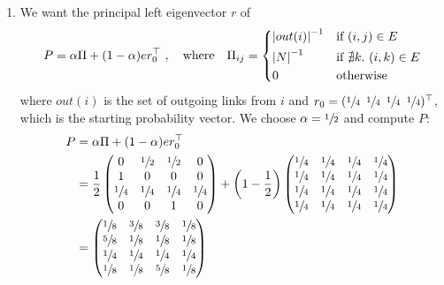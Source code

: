\begin{enumerate}
  \item We want the principal left eigenvector $r$ of
  \begin{align*}
    P = \alpha\Pi + (1 - \alpha) er_0^\top\ ,
    \quad\text{where}\quad
    \Pi_{ij} =
    \begin{cases*}
      \left|out(i)\right|^{-1} & if $(i, j)
      \in E$\\
      \left| N \right|^{-1} & if $\nexists k.\ (i, k) \in E$\\
      0 & otherwise
    \end{cases*}
  \end{align*}
  where $out(i)$ is the set of outgoing links from $i$ and $r_0 =
  (\sfrac{1}{4}\enskip\sfrac{1}{4}\enskip\sfrac{1}{4}\enskip\sfrac{1}{4})^\top$,
  which is the starting probability vector. We choose $\alpha=\sfrac{1}{2}$ and
  compute $P$:
  \begin{align*}
    P &= \alpha\Pi +  (1 - \alpha) er_0^\top \\
      &= \frac{1}{2}
          \begin{pmatrix}
            0&\sfrac{1}{2}&\sfrac{1}{2}&0 \\
            1&0&0&0\\
            \sfrac{1}{4}&\sfrac{1}{4}&\sfrac{1}{4}&\sfrac{1}{4} \\
            0&0&1&0
          \end{pmatrix}
          +
          \left( 1 - \frac{1}{2} \right)
          \begin{pmatrix}
            \sfrac{1}{4}&\sfrac{1}{4}&\sfrac{1}{4}&\sfrac{1}{4} \\
            \sfrac{1}{4}&\sfrac{1}{4}&\sfrac{1}{4}&\sfrac{1}{4} \\
            \sfrac{1}{4}&\sfrac{1}{4}&\sfrac{1}{4}&\sfrac{1}{4} \\
            \sfrac{1}{4}&\sfrac{1}{4}&\sfrac{1}{4}&\sfrac{1}{4}
          \end{pmatrix} \\
      &=  \begin{pmatrix}
            \sfrac{1}{8}&\sfrac{3}{8}&\sfrac{3}{8}&\sfrac{1}{8}\\
            \sfrac{5}{8}&\sfrac{1}{8}&\sfrac{1}{8}&\sfrac{1}{8}\\
            \sfrac{1}{4}&\sfrac{1}{4}&\sfrac{1}{4}&\sfrac{1}{4}\\
            \sfrac{1}{8}&\sfrac{1}{8}&\sfrac{5}{8}&\sfrac{1}{8}
          \end{pmatrix}
  \end{align*}


\end{enumerate}
